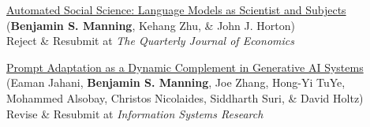 \documentclass[margin,line,pifont,palatino,courier, 9pt]{res}
\begin{document}
\begin{resume}
\href{https://www.nber.org/papers/w32381}{Automated Social Science: Language Models as Scientist and Subjects}\\
(\textbf{Benjamin S. Manning}\footnotemark[\value{footnote}], Kehang Zhu\footnotemark[\value{footnote}], \& John J. Horton)\\
Reject \& Resubmit at \textit{The Quarterly Journal of Economics}


\href{https://arxiv.org/abs/2407.14333}{Prompt Adaptation as a Dynamic Complement in Generative AI Systems}\\
(Eaman Jahani\footnotemark[\value{footnote}], \textbf{Benjamin S. Manning}, Joe Zhang, Hong-Yi TuYe, Mohammed Alsobay, Christos Nicolaides, Siddharth Suri, \& David Holtz)\\
Revise \& Resubmit at \textit{Information Systems Research}


\end{resume}
\end{document}
